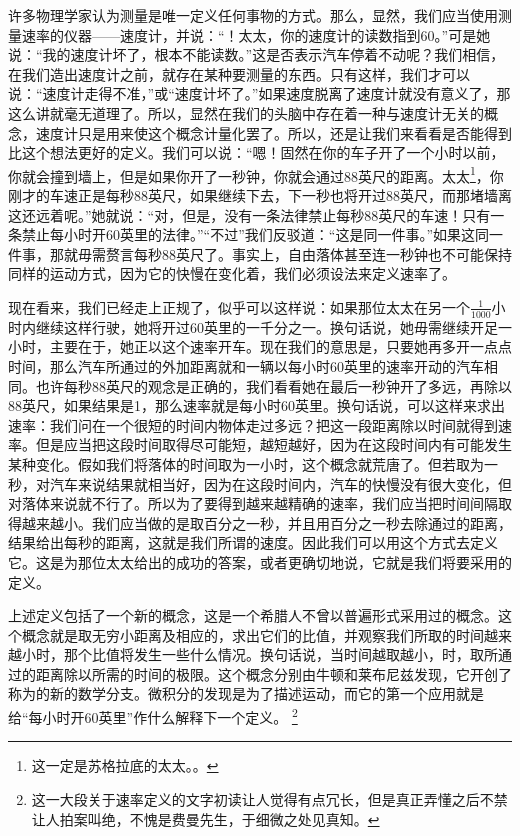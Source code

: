 \documentclass[12pt,oneside]{book}
\begin{document}
许多物理学家认为测量是唯一定义任何事物的方式。那么，显然，我们应当使用测量速率的仪器——速度计，并说：“！太太，你的速度计的读数指到60。”可是她说：“我的速度计坏了，根本不能读数。”这是否表示汽车停着不动呢？我们相信，在我们造出速度计之前，就存在某种要测量的东西。只有这样，我们才可以说：“速度计走得不准，”或“速度计坏了。”如果速度脱离了速度计就没有意义了，那这么讲就毫无道理了。所以，显然在我们的头脑中存在着一种与速度计无关的概念，速度计只是用来使这个概念计量化罢了。所以，还是让我们来看看是否能得到比这个想法更好的定义。我们可以说：“嗯！固然在你的车子开了一个小时以前，你就会撞到墙上，但是如果你开了一秒钟，你就会通过88英尺的距离。太太\footnote{这一定是苏格拉底的太太。。}，你刚才的车速正是每秒88英尺，如果继续下去，下一秒也将开过88英尺，而那堵墙离这还远着呢。”她就说：“对，但是，没有一条法律禁止每秒88英尺的车速！只有一条禁止每小时开60英里的法律。”“不过”我们反驳道：“这是同一件事。”如果这同一件事，那就毋需赘言每秒88英尺了。事实上，自由落体甚至连一秒钟也不可能保持同样的运动方式，因为它的快慢在变化着，我们必须设法来定义速率了。

现在看来，我们已经走上正规了，似乎可以这样说：如果那位太太在另一个$\frac{1}{1000}$小时内继续这样行驶，她将开过60英里的一千分之一。换句话说，她毋需继续开足一小时，主要在于，她正以这个速率开车。现在我们的意思是，只要她再多开一点点时间，那么汽车所通过的外加距离就和一辆以每小时60英里的速率开动的汽车相同。也许每秒88英尺的观念是正确的，我们看看她在最后一秒钟开了多远，再除以88英尺，如果结果是1，那么速率就是每小时60英里。换句话说，可以这样来求出速率：我们问在一个很短的时间内物体走过多远？把这一段距离除以时间就得到速率。但是应当把这段时间取得尽可能短，越短越好，因为在这段时间内有可能发生某种变化。假如我们将落体的时间取为一小时，这个概念就荒唐了。但若取为一秒，对汽车来说结果就相当好，因为在这段时间内，汽车的快慢没有很大变化，但对落体来说就不行了。所以为了要得到越来越精确的速率，我们应当把时间间隔取得越来越小。我们应当做的是取百分之一秒，并且用百分之一秒去除通过的距离，结果给出每秒的距离，这就是我们所谓的速度。因此我们可以用这个方式去定义它。这是为那位太太给出的成功的答案，或者更确切地说，它就是我们将要采用的定义。

上述定义包括了一个新的概念，这是一个希腊人不曾以普遍形式采用过的概念。这个概念就是取无穷小距离及相应的，求出它们的比值，并观察我们所取的时间越来越小时，那个比值将发生一些什么情况。换句话说，当时间越取越小，时，取所通过的距离除以所需的时间的极限。这个概念分别由牛顿和莱布尼兹发现，它开创了称为的新的数学分支。微积分的发现是为了描述运动，而它的第一个应用就是给“每小时开60英里”作什么解释下一个定义。
\footnote{这一大段关于速率定义的文字初读让人觉得有点冗长，但是真正弄懂之后不禁让人拍案叫绝，不愧是费曼先生，于细微之处见真知。}
\end{document}
